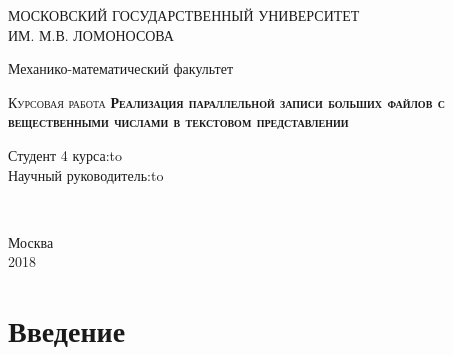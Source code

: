 \documentclass[specialist,subf,href,colorlinks=true,14pt
,times,mtpro,specialist
]{disser}
\begin{document}
\begin{titlepage} \newpage 
\begin{center} МОСКОВСКИЙ ГОСУДАРСТВЕННЫЙ УНИВЕРСИТЕТ\\ ИМ. М.В. ЛОМОНОСОВА\end{center} 
\vspace{8em} \begin{center} 
\Large Механико-математический факультет \\ \end{center}
\vspace{2em} \begin{center} 
\textsc{Курсовая работа \linebreak \textbf{Реализация параллельной записи больших файлов с вещественными числами в текстовом представлении}
\linebreak \linebreak \textbf{}} \end{center}
\vspace{6em} \newbox{\lbox}  
\newlength{\maxl} \setlength{\maxl}{\wd\lbox} \hfill\parbox{12	cm}
{ \hspace*{7.5cm}\hspace*{-5cm}Студент 4 курса:\hfill\hbox to\\
\hspace*{7.5cm}\hspace*{-5cm}Научный руководитель:\hfill\hbox to}\\  \vspace{\fill}
\begin{center} Москва \\ 2018\end{center} \end{titlepage}


\tableofcontents

\renewcommand{\figurename}{Рисунок}
\newcommand{\class}{\textcolor[rgb]{0.5,0,0.5}}
\newcommand{\type}{\textcolor[rgb]{0.5,0.5,0}}
\newcommand{\field}{\textcolor[rgb]{0.5,0,0}}

\newpage

\section*{Введение}
\end{document}
